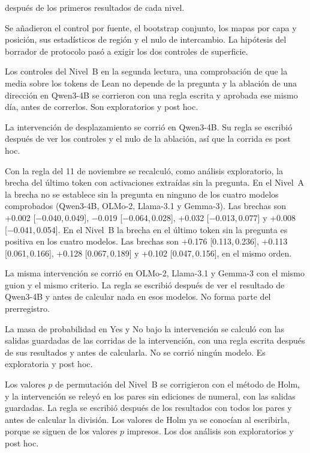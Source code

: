 \documentclass[10pt]{article}
\newcommand{\ic}[2]{[#1,\,#2]}
\begin{document}
\begin{description}[leftmargin=1.2em]
después de los primeros resultados de cada nivel.
\item[9 nov] Se añadieron el control por fuente, el bootstrap conjunto, los mapas por capa y posición, sus
estadísticos de región y el nulo de intercambio. La hipótesis del borrador de protocolo pasó a exigir los dos
controles de superficie.
\item[11 nov] Los controles del Nivel~B en la segunda lectura, una comprobación de que la media sobre los tokens de
Lean no depende de la pregunta y la ablación de una dirección en Qwen3-4B se corrieron con una regla escrita y
aprobada ese mismo día, antes de correrlos. Son exploratorios y post hoc.
\item[11--12 nov] La intervención de desplazamiento se corrió en Qwen3-4B. Su regla se escribió después de ver los
controles y el nulo de la ablación, así que la corrida es post hoc.
\item[12 nov] Con la regla del 11 de noviembre se recalculó, como análisis exploratorio, la brecha del último token con activaciones
extraídas sin la pregunta. En el Nivel~A la brecha no se establece sin la pregunta en ninguno de los cuatro modelos comprobados (Qwen3-4B, OLMo-2, Llama-3.1 y Gemma-3). Las brechas son +0.002
\ic{−0.040}{0.049}, −0.019 \ic{−0.064}{0.028}, +0.032 \ic{−0.013}{0.077} y +0.008 \ic{−0.041}{0.054}. En el Nivel~B la brecha en el último token sin la pregunta es positiva en los cuatro modelos. Las brechas son +0.176 \ic{0.113}{0.236}, +0.113 \ic{0.061}{0.166}, +0.128 \ic{0.067}{0.189} y +0.102 \ic{0.047}{0.156}, en el mismo orden.
\item[12--13 nov] La misma intervención se corrió en OLMo-2, Llama-3.1 y Gemma-3 con el mismo guion y el mismo
criterio. La regla se escribió después de ver el resultado de Qwen3-4B y antes de calcular nada en esos modelos. No
forma parte del prerregistro.
\item[13 nov] La masa de probabilidad en Yes y No bajo la intervención se calculó con las salidas guardadas de las
corridas de la intervención, con una regla escrita después de sus resultados y antes de calcularla. No se corrió
ningún modelo. Es exploratoria y post hoc.
\item[13 nov] Los valores $p$ de permutación del Nivel~B se corrigieron con el método de Holm, y la intervención se
releyó en los pares sin ediciones de numeral, con las salidas guardadas. La regla se escribió después de los
resultados con todos los pares y antes de calcular la división. Los valores de Holm ya se conocían al escribirla,
porque se siguen de los valores $p$ impresos. Los dos análisis son exploratorios y post hoc.
\end{description}
\end{document}
